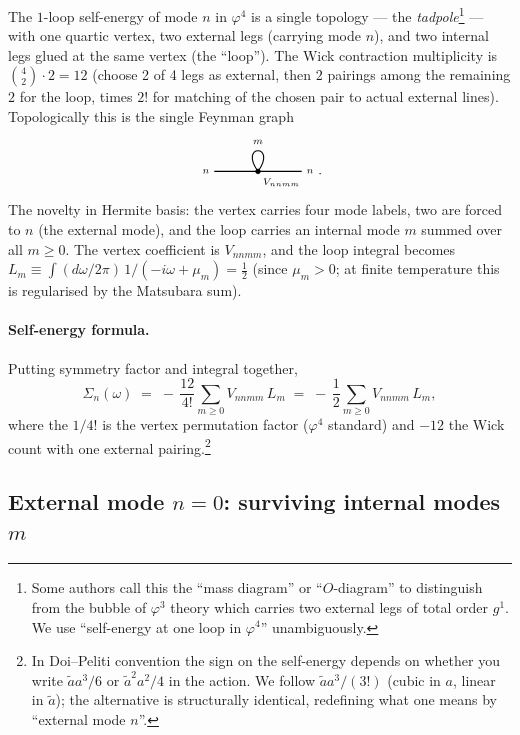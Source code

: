 \documentclass[11pt,a4paper]{article}
\newcommand{\hbubblev}[3]{%
\begin{tikzpicture}[baseline=-0.5ex,scale=1.0]
  \draw[thick] (-1.1,0)--(0,0);
  \draw[thick] (0,0)--(1.1,0);
  \draw[thick] (0,0) .. controls (-0.5,0.7) and (0.5,0.7) .. (0,0);
  \filldraw[black] (0,0) circle (0.06);
  \node[left]  at (-1.1,0) {\scriptsize $#1$};
  \node[right] at ( 1.1,0) {\scriptsize $#2$};
  \node at (0,0.75) {\scriptsize $#3$};
  \node[below right] at (0,-0.05) {\scriptsize $V_{#1#2#3#3}$};
\end{tikzpicture}}
\begin{document}
The $1$-loop self-energy of mode $n$ in $\varphi^{4}$ is a single topology --- the
\emph{tadpole}\footnote{Some authors call this the ``mass diagram'' or
``$O$-diagram'' to distinguish from the bubble of $\varphi^{3}$ theory which carries two
external legs of total order $g^{1}$. We use ``self-energy at one loop in $\varphi^{4}$''
unambiguously.} --- with one quartic vertex, two external legs (carrying mode $n$), and
two internal legs glued at the same vertex (the ``loop''). The Wick contraction
multiplicity is $\binom{4}{2}\cdot 2 = 12$ (choose 2 of 4 legs as external, then $2$
pairings among the remaining $2$ for the loop, times $2!$ for matching of the chosen pair
to actual external lines). Topologically this is the single Feynman graph
\[
\hbubblev{n}{n}{m}.
\]
The novelty in Hermite basis: the vertex carries four mode labels, two are forced to $n$
(the external mode), and the loop carries an internal mode $m$ summed over all $m\ge 0$.
The vertex coefficient is $V_{n n m m}$, and the loop integral becomes
$L_{m} \equiv \int (d\omega/2\pi)\,1/(-i\omega + \mu_{m}) = \tfrac12$ (since $\mu_{m}>0$;
at finite temperature this is regularised by the Matsubara sum).

\paragraph{Self-energy formula.} Putting symmetry factor and integral together,
\[
\boxed{\;
\Sigma_{n}(\omega) \;=\; -\,\frac{12}{4!}\!\sum_{m\ge 0} V_{n n m m}\,L_{m}
\;=\; -\,\frac{1}{2}\!\sum_{m\ge 0} V_{n n m m}\,L_{m},
\;}
\]
where the $1/4!$ is the vertex permutation factor ($\varphi^{4}$ standard) and $-12$ the
Wick count with one external pairing.\footnote{In Doi--Peliti convention the sign on the
self-energy depends on whether you write $\widetilde a a^{3}/6$ or $\widetilde a^{2}a^{2}/4$
in the action. We follow $\widetilde a a^{3}/(3!)$ (cubic in $a$, linear in $\widetilde
a$); the alternative is structurally identical, redefining what one means by ``external
mode $n$''.}

\subsection{External mode $n=0$: surviving internal modes $m$}
\end{document}
